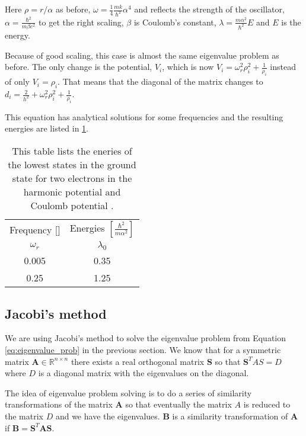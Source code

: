 Here $\rho = r/\alpha$ as before, $\omega = \frac{1}{4}\frac{mk}{\hbar^2}\alpha^4$ and reflects the strength of the oscillator, $\alpha = \frac{\hbar^2}{m \beta e^2}$ to get the right scaling, $\beta$ is Coulomb's constant, $\lambda = \frac{m\alpha^2}{\hbar^2}E$ and $E$ is the energy.

Because of good scaling, this case is almost the same eigenvalue problem as before. The only change is the potential, $V_i$, which is now $V_i = \omega_r^2 \rho_i^2+ \frac{1}{\rho_i}$ instead of only $V_i = \rho_i$. That means that the diagonal of the matrix changes to $d_i = \frac{2}{h^2} + \omega_r^2\rho_i^2 + \frac{1}{\rho_i}$.

This equation has analytical solutions for some frequencies and the resulting energies are listed in \ref{tab:analytical_energies}.

\begin{table}[H]\caption{This table lists the eneries of the lowest states in the ground state for two electrons in the harmonic potential and Coulomb potential \cite{taut1993two}.}\label{tab:analytical_energies}
\begin{tabular}{cc}
Frequency [] & Energies $\left[\frac{\hbar^2}{m \alpha^2}\right]$\\
$\omega_r$ & $\lambda_0$\\ \hline
0.005 & 0.35\\
0.25 & 1.25\\
\end{tabular}
\end{table}

\subsection{Jacobi's method}

We are using Jacobi's method to solve the eigenvalue problem from Equation \ref{eq:eigenvalue_prob} in the previous section. We know that for a symmetric matrix $\textbf{A} \in \mathbb{R}^{n\times n}$ there exists a real orthogonal matrix $\textbf{S}$ so that $ \textbf{S}^{T}AS = D$ where $D$ is a diagonal matrix with the eigenvalues on the diagonal.

The idea of eigenvalue problem solving is to do a series of similarity transformations of the matrix $\textbf{A}$ so that eventually the matrix $A$ is reduced to the matrix $D$ and we have the eigenvalues. $\textbf{B}$ is a similarity transformation of $\textbf{A}$ if $\textbf{B} = \textbf{S}^T\textbf{A}\textbf{S}$.

